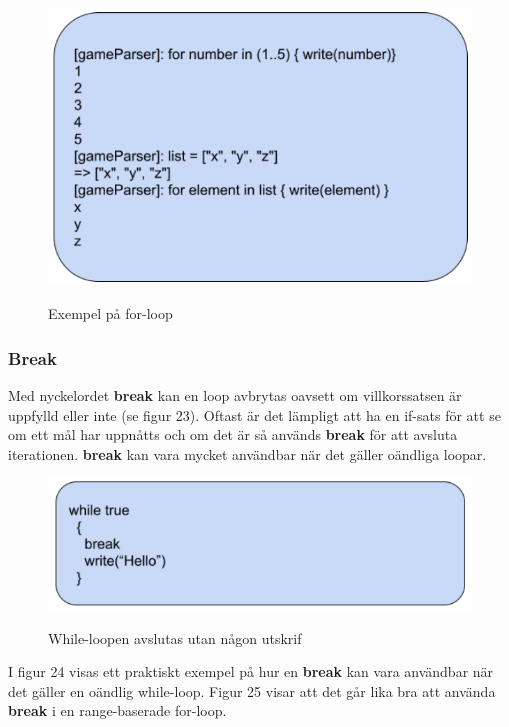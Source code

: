 \documentclass{Dokumentmall}
\begin{document}
\begin{figure}[h!]
  \centering
  \includegraphics[scale = 0.65]{Images/Figur22.png}
  \label{}
  \caption{Exempel på for-loop}
\end{figure}

\newpage
\subsubsection{Break}
Med nyckelordet \textbf{break} kan en loop avbrytas oavsett om villkorssatsen är uppfylld eller inte (se figur 23). Oftast är det lämpligt att ha en if-sats för att se om ett mål har uppnåtts och om det är så används \textbf{break} för att avsluta iterationen. \textbf{break} kan vara mycket användbar när det gäller oändliga loopar.

\begin{figure}[h!]
  \centering
  \includegraphics[scale = 0.65]{Images/Figur23.png}
  \label{}
  \caption{While-loopen avslutas utan någon utskrif}
\end{figure}

\newpage
I figur 24 visas ett praktiskt exempel på hur en \textbf{break} kan vara användbar när det gäller en oändlig while-loop. Figur 25 visar att det går lika bra att använda \textbf{break} i en range-baserade for-loop.
\end{document}
